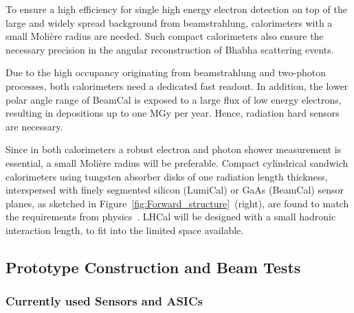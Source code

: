 To ensure a high efficiency for single high energy electron detection on top of the large and widely spread
background from beamstrahlung, calorimeters with a small Moli\`{e}re radius are needed. Such compact calorimeters 
also ensure the necessary  precision in the angular reconstruction of Bhabha scattering events.

Due to the high occupancy originating from beamstrahlung and two-photon processes,
both calorimeters need a dedicated fast readout.
In addition, the lower polar angle range of BeamCal is exposed to a large flux
of low energy electrons, resulting in depositions up to one
MGy per year. Hence, radiation hard sensors are necessary.

Since in both calorimeters a robust electron and photon shower measurement
is essential, a small Moli\`{e}re radius will be preferable.
Compact
cylindrical sandwich
calorimeters using tungsten absorber disks of one radiation length thickness, interspersed with
finely segmented silicon (LumiCal) or GaAs (BeamCal) sensor planes, as sketched in
Figure~\ref{fig:Forward_structure}~(right),
are found
to match the requirements from physics~\cite{2010JInst...512002A}.
LHCal will be designed with a small hadronic interaction length, to fit into the limited space available.

\subsection{Prototype Construction and Beam Tests}

\subsubsection{Currently used Sensors and ASICs}


